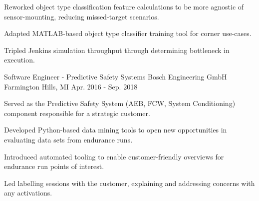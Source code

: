 \begin{cventries}
{\begin{cvitems}
        \item {Reworked object type classification feature calculations to be more agnostic of sensor-mounting, reducing missed-target scenarios.}
        \iflongform        
        \item {Adapted MATLAB-based object type classifier training tool for corner use-cases.}
        \item {Tripled Jenkins simulation throughput through determining bottleneck in execution.}
        \fi
      \end{cvitems}
    }

  \cventry
    {Software Engineer - Predictive Safety Systems} %
    {Bosch Engineering GmbH} %
    {Farmington Hills, MI} %
    {Apr. 2016 - Sep. 2018} %
    {
      \begin{cvitems} %
        \item {Served as the Predictive Safety System (AEB, FCW, System Conditioning) component responsible for a strategic customer.}
        \item {Developed Python-based data mining tools to open new opportunities in evaluating data sets from endurance runs.}
        \item {Introduced automated tooling to enable customer-friendly overviews for endurance run points of interest.}
        \item {Led labelling sessions with the customer, explaining and addressing concerns with any activations.}
      \end{cvitems}
    }


\end{cventries}
